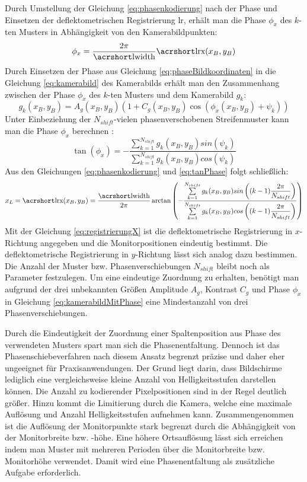 \p
Durch Umstellung der Gleichung \ref{eq:phasenkodierung} nach der Phase und Einsetzen der deflektometrischen Registrierung \acrshort{lr}, erhält man die Phase $\phi_x$ des $k$-ten Musters in Abhängigkeit von den Kamerabildpunkten:
%
\begin{equation}\label{eq:phaseBildkoordinaten}
	\phi_x = \dfrac{2\pi}{\acrshortmath{lwidth}}\acrshortmath{lrx}(x_B, y_B)
\end{equation}
%
Durch Einsetzen der Phase aus Gleichung \ref{eq:phaseBildkoordinaten} in die Gleichung \ref{eq:kamerabild} des Kamerabilds erhält man den Zusammenhang zwischen der Phase $\phi_x$ des $k$-ten Musters und dem Kamerabild   $g_k$:
%
\begin{equation}\label{eq:kamerabildMitPhase}
	g_k(x_B, y_B) = A_g(x_B, y_B) \left(1 + C_g(x_B, y_B) \cos \left(\phi_x(x_B, y_B) + \psi_k\right)\right)
\end{equation}
%
Unter Einbeziehung der $N_{shift}$-vielen phasenverschobenen Streifenmuster kann man die Phase $\phi_x$ berechnen \cite{kit_werling}:
%
\begin{equation}\label{eq:tanPhase}
	\tan (\phi_x) = -\dfrac{\sum\limits_{k=1}^{N_{shift}} g_k(x_B, y_B) sin(\psi_k)}{\sum\limits_{k=1}^{N_{shift}} g_k(x_B, y_B) cos(\psi_k)}
\end{equation}
%
Aus den Gleichungen \ref{eq:phasenkodierung} und \ref{eq:tanPhase} folgt schließlich:
%
\begin{equation}\label{eq:registrierungX}
	x_L = \acrshortmath{lrx}(x_B, y_B) = 
	\dfrac{\acrshortmath{lwidth}}{2\pi}
	\arctan 
	\left( 
		-\dfrac
		{\sum\limits_{k=1}^{N_{shift}} g_k(x_B, y_B) sin\left((k - 1)\dfrac{2\pi}{N_{shift}}\right)}
		{\sum\limits_{k=1}^{N_{shift}} g_k(x_B, y_B) cos\left((k - 1)\dfrac{2\pi}{N_{shift}}\right)}
	\right)
\end{equation}
%
Mit der Gleichung \ref{eq:registrierungX} ist die deflektometrische Registrierung in $x$-Richtung angegeben und die Monitorpositionen eindeutig bestimmt.
Die deflektometrische Registrierung in $y$-Richtung lässt sich analog dazu bestimmen.
Die Anzahl der Muster bzw. Phasenverschiebungen $N_{shift}$ bleibt noch als Parameter festzulegen.
Um eine eindeutige Zuordnung zu erhalten, benötigt man aufgrund der drei unbekannten Größen Amplitude $A_g$, Kontrast $C_g$ und Phase $\phi_x$ in Gleichung \ref{eq:kamerabildMitPhase} eine Mindestanzahl von drei Phasenverschiebungen.

\p
Durch die Eindeutigkeit der Zuordnung einer Spaltenposition aus Phase des verwendeten Musters spart man sich die Phasenentfaltung.
Dennoch ist das Phasenschiebeverfahren nach diesem Ansatz begrenzt präzise und daher eher ungeeignet für Praxisanwendungen.
Der Grund liegt darin, dass Bildschirme lediglich eine vergleichsweise kleine Anzahl von Helligkeitsstufen darstellen können.
Die Anzahl zu kodierender Pixelpositionen sind in der Regel deutlich größer.
Hinzu kommt die Limitierung durch die Kamera, welche eine maximale Auflösung und Anzahl Helligkeitsstufen aufnehmen kann.
Zusammengenommen ist die Auflösung der Monitorpunkte stark begrenzt durch die Abhängigkeit von der Monitorbreite bzw. -höhe.
Eine höhere Ortsauflösung lässt sich erreichen indem man Muster mit mehreren Perioden über die Monitorbreite bzw. Monitorhöhe verwendet.
Damit wird eine Phasenentfaltung als zusätzliche Aufgabe erforderlich.